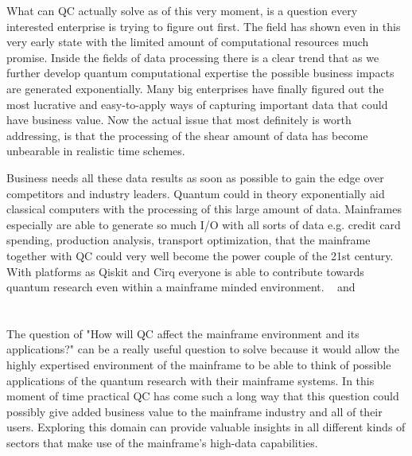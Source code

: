 What can QC actually solve as of this very moment, is a question every interested enterprise is trying to figure out first. The field has shown even in this very early state with the limited amount of computational resources much promise. Inside the fields of data processing there is a clear trend that as we further develop quantum computational expertise the possible business impacts are generated exponentially. Many big enterprises have finally figured out the most lucrative and easy-to-apply ways of capturing important data that could have business value. Now the actual issue that most definitely is worth addressing, is that the processing of the shear amount of data has become unbearable in realistic time schemes. 

Business needs all these data results as soon as possible to gain the edge over competitors and industry leaders. Quantum could in theory exponentially aid classical computers with the processing of this large amount of data. Mainframes especially are able to generate so much I/O with all sorts of data e.g. credit card spending, production analysis, transport optimization, that the mainframe together with QC could very well become the power couple of the 21st century. With platforms as Qiskit and Cirq everyone is able to contribute towards quantum research even within a mainframe minded environment.  ~\autocite{Qiskit} and ~\autocite{Cirq}

\section{}
\label{sec:onderzoeksvraag}

The question of "How will QC affect the mainframe environment and its applications?" can be a really useful question to solve because it would allow the highly expertised environment of the mainframe to be able to think of possible applications of the quantum research with their mainframe systems. In this moment of time practical QC has come such a long way that this question could possibly give added business value to the mainframe industry and all of their users. Exploring this domain can provide valuable insights in all different kinds of sectors that make use of the mainframe's high-data capabilities.

\section{}
\label{sec:onderzoeksdoelstelling}

